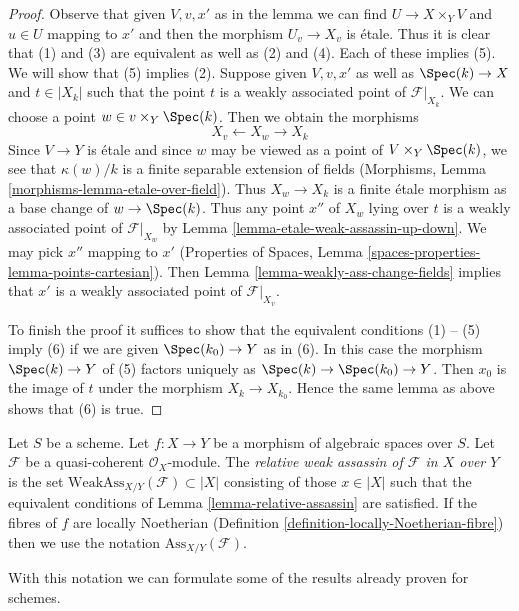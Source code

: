 \begin{proof}
Observe that given $V, v, x'$ as in the lemma we can find
$U \to X \times_Y V$ and $u \in U$ mapping to $x'$
and then the morphism $U_v \to X_v$ is \'etale.
Thus it is clear that (1) and (3) are equivalent
as well as (2) and (4). Each of these implies (5).
We will show that (5) implies (2).
Suppose given $V, v, x'$ as well as $\Spec(k) \to X$ and $t \in |X_k|$
such that the point $t$ is a weakly
associated point of $\mathcal{F}|_{X_k}$.
We can choose a point $w \in v \times_Y \Spec(k)$.
Then we obtain the morphisms
$$
X_v \longleftarrow X_w \longrightarrow X_k
$$
Since $V \to Y$ is \'etale and since $w$ may be viewed as a point of
$V \times_Y \Spec(k)$, we see that $\kappa(w)/k$
is a finite separable extension of fields
(Morphisms, Lemma \ref{morphisms-lemma-etale-over-field}).
Thus $X_w \to X_k$ is a finite \'etale morphism as a base change of
$w \to \Spec(k)$. Thus any point $x''$ of $X_w$ lying over $t$
is a weakly associated point of $\mathcal{F}|_{X_w}$ by
Lemma \ref{lemma-etale-weak-assassin-up-down}.
We may pick $x''$ mapping to $x'$
(Properties of Spaces, Lemma \ref{spaces-properties-lemma-points-cartesian}).
Then Lemma \ref{lemma-weakly-ass-change-fields}
implies that $x'$ is a weakly associated
point of $\mathcal{F}|_{X_v}$.

\medskip\noindent
To finish the proof it suffices to show that the equivalent
conditions (1) -- (5) imply (6) if we are given
$\Spec(k_0) \to Y$ as in (6). In this case the morphism
$\Spec(k) \to Y$ of (5) factors uniquely as $\Spec(k) \to \Spec(k_0) \to Y$.
Then $x_0$ is the image of $t$ under the morphism $X_k \to X_{k_0}$.
Hence the same lemma as above shows that (6) is true.
\end{proof}

\begin{definition}
\label{definition-relative-weak-assassin}
Let $S$ be a scheme. Let $f : X \to Y$ be a morphism of algebraic spaces
over $S$. Let $\mathcal{F}$ be a quasi-coherent $\mathcal{O}_X$-module.
The {\it relative weak assassin of $\mathcal{F}$ in $X$ over $Y$}
is the set $\text{WeakAss}_{X/Y}(\mathcal{F}) \subset |X|$
consisting of those $x \in |X|$ such that the equivalent conditions of
Lemma \ref{lemma-relative-assassin} are satisfied.
If the fibres of $f$ are locally Noetherian
(Definition \ref{definition-locally-Noetherian-fibre})
then we use the notation $\text{Ass}_{X/Y}(\mathcal{F})$.
\end{definition}

\noindent
With this notation we can formulate some of the results
already proven for schemes.

